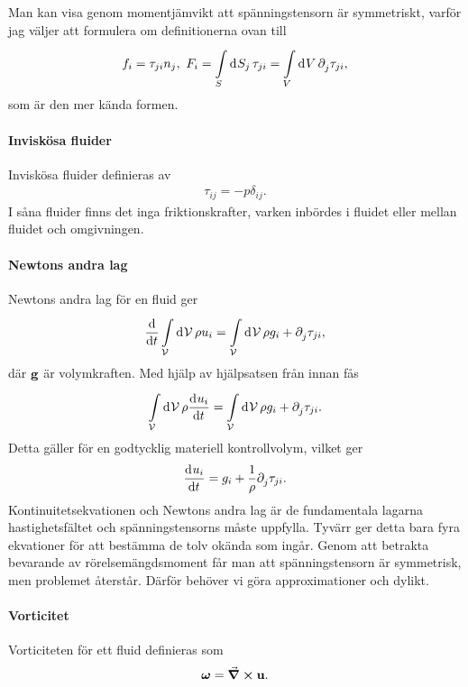 Man kan visa genom momentjämvikt att spänningstensorn är symmetriskt, varför jag väljer att formulera om definitionerna ovan till
\begin{align*}
	f_{i} = \tau_{ji}n_{j},\ F_{i} = \int\limits_{S}^{}\dd[]{S_{j}}\tau_{ji} = \int\limits_{V}^{}\dd[]{V}\partial_{j}^{}\tau_{ji},
\end{align*}
som är den mer kända formen.

\paragraph{Inviskösa fluider}
Inviskösa fluider definieras av
\begin{align*}
	\tau_{ij} = -p\delta_{ij}.
\end{align*}
I såna fluider finns det inga friktionskrafter, varken inbördes i fluidet eller mellan fluidet och omgivningen.

\paragraph{Newtons andra lag}
Newtons andra lag för en fluid ger
\begin{align*}
	\dv{t}\int\limits_{\mathcal{V}}^{}\dd[]{\mathcal{V}}\rho u_{i} = \int\limits_{\mathcal{V}}^{}\dd[]{\mathcal{V}}\rho g_{i} + \partial_{j}^{}\tau_{ji},
\end{align*}
där $\vb{g}$ är volymkraften. Med hjälp av hjälpsatsen från innan fås
\begin{align*}
	\int\limits_{\mathcal{V}}^{}\dd[]{\mathcal{V}}\rho\dv[]{u_{i}}{t} = \int\limits_{\mathcal{V}}^{}\dd[]{\mathcal{V}}\rho g_{i} + \partial_{j}^{}\tau_{ji}.
\end{align*}
Detta gäller för en godtycklig materiell kontrollvolym, vilket ger
\begin{align*}
	\dv[]{u_{i}}{t} = g_{i} + \frac{1}{\rho}\partial_{j}^{}\tau_{ji}.
\end{align*}
Kontinuitetsekvationen och Newtons andra lag är de fundamentala lagarna hastighetsfältet och spänningstensorns måste uppfylla. Tyvärr ger detta bara fyra ekvationer för att bestämma de tolv okända som ingår. Genom att betrakta bevarande av rörelsemängdsmoment får man att spänningstensorn är symmetrisk, men problemet återstår. Därför behöver vi göra approximationer och dylikt.

\paragraph{Vorticitet}
Vorticiteten för ett fluid definieras som
\begin{align*}
	\vb*{\omega} = \curl{\vb{u}}.
\end{align*}

